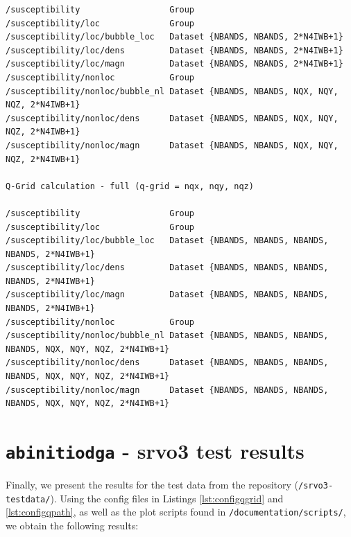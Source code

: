 \documentclass[a4paper,11pt]{article}
\numberwithin{equation}{section} %
\begin{document}
\begin{lstlisting}[caption=susceptibility output comparison, frame=single, basicstyle=\scriptsize]
/susceptibility                  Group
/susceptibility/loc              Group
/susceptibility/loc/bubble_loc   Dataset {NBANDS, NBANDS, 2*N4IWB+1}
/susceptibility/loc/dens         Dataset {NBANDS, NBANDS, 2*N4IWB+1}
/susceptibility/loc/magn         Dataset {NBANDS, NBANDS, 2*N4IWB+1}
/susceptibility/nonloc           Group
/susceptibility/nonloc/bubble_nl Dataset {NBANDS, NBANDS, NQX, NQY, NQZ, 2*N4IWB+1}
/susceptibility/nonloc/dens      Dataset {NBANDS, NBANDS, NQX, NQY, NQZ, 2*N4IWB+1}
/susceptibility/nonloc/magn      Dataset {NBANDS, NBANDS, NQX, NQY, NQZ, 2*N4IWB+1}

Q-Grid calculation - full (q-grid = nqx, nqy, nqz)

/susceptibility                  Group
/susceptibility/loc              Group
/susceptibility/loc/bubble_loc   Dataset {NBANDS, NBANDS, NBANDS, NBANDS, 2*N4IWB+1}
/susceptibility/loc/dens         Dataset {NBANDS, NBANDS, NBANDS, NBANDS, 2*N4IWB+1}
/susceptibility/loc/magn         Dataset {NBANDS, NBANDS, NBANDS, NBANDS, 2*N4IWB+1}
/susceptibility/nonloc           Group
/susceptibility/nonloc/bubble_nl Dataset {NBANDS, NBANDS, NBANDS, NBANDS, NQX, NQY, NQZ, 2*N4IWB+1}
/susceptibility/nonloc/dens      Dataset {NBANDS, NBANDS, NBANDS, NBANDS, NQX, NQY, NQZ, 2*N4IWB+1}
/susceptibility/nonloc/magn      Dataset {NBANDS, NBANDS, NBANDS, NBANDS, NQX, NQY, NQZ, 2*N4IWB+1}

\end{lstlisting}

\newpage
\section{\protect\Verb+abinitiodga+ - srvo3 test results}

Finally, we present the results for the test data from the repository (\verb+/srvo3-testdata/+).
Using the config files in Listings \ref{lst:configqgrid} and \ref{lst:configqpath}, as well as the plot scripts
found in {\color{blue}\verb+/documentation/scripts/+}, we obtain the following results:
\end{document}
